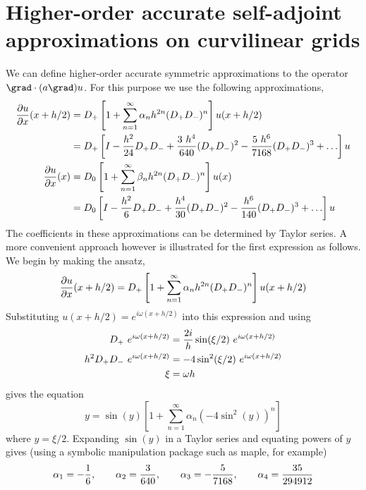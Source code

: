 \documentclass[10pt]{article}
\begin{document}
\clearpage


\clearpage

\clearpage


\clearpage
\section{Higher-order accurate self-adjoint approximations on curvilinear grids}


We can define higher-order accurate symmetric approximations to the operator $\grad\cdot( a \grad)u$.
For this purpose we use the following approximations,
\begin{align*}
 {\partial u \over \partial x}(x+h/2) 
                        &= D_+\left[ 1 + \sum_{n=1}^{\infty}  \alpha_n h^{2n} (D_+D_-)^n \right] u(x+h/2) \\
                        &= D_+\left[ I - {h^2\over 24}D_+D_- + {3~h^4\over 640}(D_+D_-)^2 
                                                 - {5~h^6\over 7168}(D_+D_-)^3 +\ldots \right] u \\
 {\partial u \over \partial x}(x) 
                         &= D_0\left[ 1 + \sum_{n=1}^{\infty}  \beta_n h^{2n} (D_+D_-)^n \right] u(x) \\
                         &= D_0\left[ I - {h^2\over 6}D_+D_- + {h^4\over 30}(D_+D_-)^2 
                                                 - {h^6\over 140}(D_+D_-)^3 +\ldots \right] u \\ 
\end{align*}
The coefficients in these approximations can be determined by Taylor series. A more convenient approach however is
illustrated for the first expression as follows. We begin by making the ansatz,
\[
  {\partial u \over \partial x}(x+h/2) = D_+\left[ 1 + \sum_{n=1}^{\infty}  \alpha_n h^{2n} (D_+D_-)^n \right] u(x+h/2)
\]
Substituting $u(x+h/2)=e^{i\omega (x+h/2)}$ into this expression and using
\begin{align*}
  D_+ ~e^{i\omega (x+h/2)} &= {2 i\over h}  \sin(\xi/2)~e^{i\omega (x+h/2)} \\
  h^2 D_+D_- ~e^{i\omega (x+h/2)} &= - 4  \sin^2(\xi/2)~e^{i\omega (x+h/2)} \\
  \xi &= \omega h
\end{align*}
gives the equation
\[
    y = \sin(y) \left[ 1 + \sum_{n=1}^{\infty} \alpha_n (- 4 \sin^2(y))^n \right]
\]
where $y=\xi/2$. Expanding $\sin(y)$ in a Taylor series and
equating powers of $y$ gives (using a symbolic manipulation package such as maple, for example)
\[
  \alpha_1 = -{1\over6}, \qquad \alpha_2= {3\over 640} , \qquad \alpha_3= -{5\over 7168}, \qquad \alpha_4={35\over 294912}
\]
\end{document}
